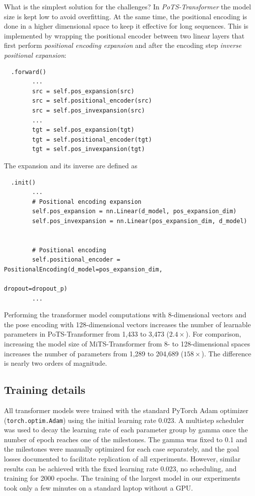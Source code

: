 \documentclass[final]{article}
\begin{document}
What is the simplest solution for the challenges? In \textit{PoTS-Transformer} the model size is kept low to avoid overfitting. At the same time, the positional encoding is done in a higher dimensional space to keep it effective for long sequences. This is implemented by wrapping the positional encoder between two linear layers that first perform \textit{positional encoding expansion} and after the encoding step \textit{inverse positional expansion}:
\begin{lstlisting}
  .forward()
        ...
        src = self.pos_expansion(src)
        src = self.positional_encoder(src)
        src = self.pos_invexpansion(src)
        ...
        tgt = self.pos_expansion(tgt)
        tgt = self.positional_encoder(tgt)
        tgt = self.pos_invexpansion(tgt)
\end{lstlisting}
The expansion and its inverse are defined as
\begin{lstlisting}
  .init()
        ...
        # Positional encoding expansion
        self.pos_expansion = nn.Linear(d_model, pos_expansion_dim)
        self.pos_invexpansion = nn.Linear(pos_expansion_dim, d_model)
        

        # Positional encoding
        self.positional_encoder = PositionalEncoding(d_model=pos_expansion_dim,
                                                     dropout=dropout_p)
        ...
\end{lstlisting}

Performing the transformer model computations with 8-dimensional vectors and the pose encoding with 128-dimensional vectors increases the number of learnable parameters in PoTS-Transformer from 1,433 to 3,473 ($2.4\times$). For comparison, increasing the model size of MiTS-Transformer from 8- to 128-dimensional spaces increases the number of parameters from 1,289 to 204,689 ($158\times$). The difference is nearly two orders of magnitude.

\subsection{Training details}
All transformer models were trained with the standard PyTorch Adam optimizer (\texttt{torch.optim.Adam}) using the initial learning rate 0.023. A multistep scheduler was used to decay the learning rate of each parameter group by gamma once the number of epoch reaches one of the milestones. The gamma was fixed to 0.1 and the milestones were manually optimized for each case separately, and the goal losses documented to facilitate replication of all experiments. However, similar results can be achieved with the fixed learning rate 0.023, no scheduling, and training for 2000 epochs. The training of the largest model in our experiments took only a few minutes on a standard laptop without a GPU.
\end{document}
